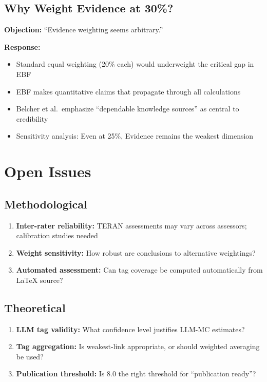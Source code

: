 \documentclass[11pt,a4paper]{article}
\begin{document}
\subsection{Why Weight Evidence at 30\%?}

\textbf{Objection:} ``Evidence weighting seems arbitrary.''

\textbf{Response:}
\begin{itemize}
    \item Standard equal weighting (20\% each) would underweight the critical gap in EBF
    \item EBF makes quantitative claims that propagate through all calculations
    \item Belcher et al.\ emphasize ``dependable knowledge sources'' as central to credibility
    \item Sensitivity analysis: Even at 25\%, Evidence remains the weakest dimension
\end{itemize}


\section{Open Issues}

\subsection{Methodological}

\begin{enumerate}
    \item \textbf{Inter-rater reliability:} TERAN assessments may vary across assessors; calibration studies needed
    \item \textbf{Weight sensitivity:} How robust are conclusions to alternative weightings?
    \item \textbf{Automated assessment:} Can tag coverage be computed automatically from LaTeX source?
\end{enumerate}

\subsection{Theoretical}

\begin{enumerate}
    \item \textbf{LLM tag validity:} What confidence level justifies LLM-MC estimates?
    \item \textbf{Tag aggregation:} Is weakest-link appropriate, or should weighted averaging be used?
    \item \textbf{Publication threshold:} Is 8.0 the right threshold for ``publication ready''?
\end{enumerate}
\end{document}
